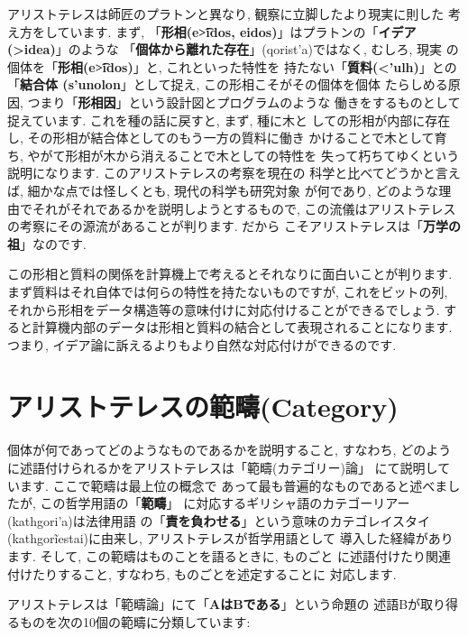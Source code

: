 アリストテレスは師匠のプラトンと異なり, 観察に立脚したより現実に則した
考え方をしています. まず, 「\textbf{\textbf{形相(\textgreek{e\t{>i}dos},  
 eidos)}}」はプラトンの「\textbf{イデア(\textgreek{>idea})}」のような
「\textbf{個体から離れた存在}」(\textgreek{qorist'a})ではなく, むしろ, 現実
の個体を「\textbf{形相(\textgreek{e\t{>i}dos})}」と, これといった特性を
持たない「\textbf{質料(\textgreek{<'ulh})}」との「\textbf{結合体
(\textgreek{s'unolon}}」として捉え, この形相こそがその個体を個体
たらしめる原因, つまり「\textbf{形相因}」という設計図とプログラムのような
働きをするものとして捉えています. これを種の話に戻すと, まず, 種に木と
しての形相が内部に存在し, その形相が結合体としてのもう一方の質料に働き
かけることで木として育ち, やがて形相が木から消えることで木としての特性を
失って朽ちてゆくという説明になります. このアリストテレスの考察を現在の
科学と比べてどうかと言えば, 細かな点では怪しくとも, 現代の科学も研究対象
が何であり, どのような理由でそれがそれであるかを説明しようとするもので, 
 この流儀はアリストテレスの考察にその源流があることが判ります. だから
こそアリストテレスは「\textbf{万学の祖}」なのです.
\newline

この形相と質料の関係を計算機上で考えるとそれなりに面白いことが判ります.
 まず質料はそれ自体では何らの特性を持たないものですが, これをビットの列,
それから形相をデータ構造等の意味付けに対応付けることができるでしょう.
 すると計算機内部のデータは形相と質料の結合として表現されることになります.
 つまり, イデア論に訴えるよりもより自然な対応付けができるのです.


\section{アリストテレスの範疇(Category)}


個体が何であってどのようなものであるかを説明すること, すなわち,
 どのように述語付けられるかをアリストテレスは「範疇(カテゴリー)論」
\cite{アリストテレス1}にて説明しています. ここで範疇は最上位の概念で
あって最も普遍的なものであると述べましたが, この哲学用語の「\textbf{範疇}」
に対応するギリシャ語のカテゴーリアー(\textgreek{kathgori'a})は法律用語
の「\textbf{責を負わせる}」という意味のカテゴレイスタイ
(\textgreek{kathgor\~{i}estai})に由来し, アリストテレスが哲学用語として
導入した経緯があります. そして, この範疇はものことを語るときに, ものごと
に述語付けたり関連付けたりすること, すなわち, ものごとを述定することに
対応します.
\newline


アリストテレスは「範疇論」にて「\textbf{AはBである}」という命題の
述語Bが取り得るものを次の10個の範疇に分類しています:


